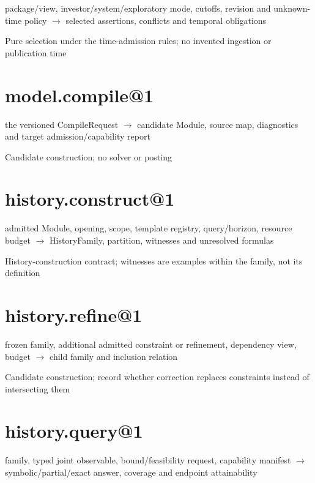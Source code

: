package/view, investor/system/exploratory mode, cutoffs, revision and unknown-time policy \ensuremath{\rightarrow} selected assertions, conflicts and temporal obligations

Pure selection under the time-admission rules; no invented ingestion or publication time

\hypertarget{model.compile1}{%
\section{model.compile@1}\label{model.compile1}}

the versioned CompileRequest \ensuremath{\rightarrow} candidate Module, source map, diagnostics and target admission/capability report

Candidate construction; no solver or posting

\hypertarget{history.construct1}{%
\section{history.construct@1}\label{history.construct1}}

admitted Module, opening, scope, template registry, query/horizon, resource budget \ensuremath{\rightarrow} HistoryFamily, partition, witnesses and unresolved formulas

History-construction contract; witnesses are examples within the family, not its definition

\hypertarget{history.refine1}{%
\section{history.refine@1}\label{history.refine1}}

frozen family, additional admitted constraint or refinement, dependency view, budget \ensuremath{\rightarrow} child family and inclusion relation

Candidate construction; record whether correction replaces constraints instead of intersecting them

\hypertarget{history.query1}{%
\section{history.query@1}\label{history.query1}}

family, typed joint observable, bound/feasibility request, capability manifest \ensuremath{\rightarrow} symbolic/partial/exact answer, coverage and endpoint attainability


